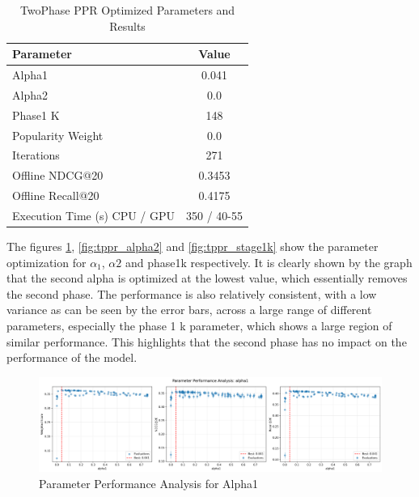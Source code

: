 \documentclass[conference,compsoc]{IEEEtran}
\begin{document}
\begin{table}[!ht]
    \centering
    \caption{TwoPhase PPR Optimized Parameters and Results}
    \label{tab:two_ppr_results}
    \begin{tabular}{lc}
    \toprule
    \textbf{Parameter} & \textbf{Value} \\
    \midrule
     Alpha1 & 0.041 \\
     Alpha2 & 0.0 \\
     Phase1 K & 148 \\
     Popularity Weight & 0.0\\
     Iterations & 271\\
    Offline NDCG@20 & 0.3453\\
    Offline Recall@20 & 0.4175\\
     Execution Time (s) CPU / GPU & 350 / 40-55 \\
    \bottomrule
    \end{tabular}
\end{table}

The figures \ref{fig:tppr_alpha1}, \ref{fig:tppr_alpha2} and \ref{fig:tppr_stage1k} show the parameter optimization for $\alpha_1$, $\alpha2$ and phase1k respectively. It is clearly shown by the graph that the second alpha is optimized at the lowest value, which essentially removes the second phase. The performance is also relatively consistent, with a low variance as can be seen by the error bars, across a large range of different parameters, especially the phase 1 k parameter, which shows a large region of similar performance. This highlights that the second phase has no impact on the performance of the model.
\begin{figure}[!ht]
    \centering
    \includegraphics[width=\linewidth]{images/parameter_analysis_alpha1.png}
    \caption{Parameter Performance Analysis for Alpha1}
    \label{fig:tppr_alpha1}
\end{figure}
\end{document}

